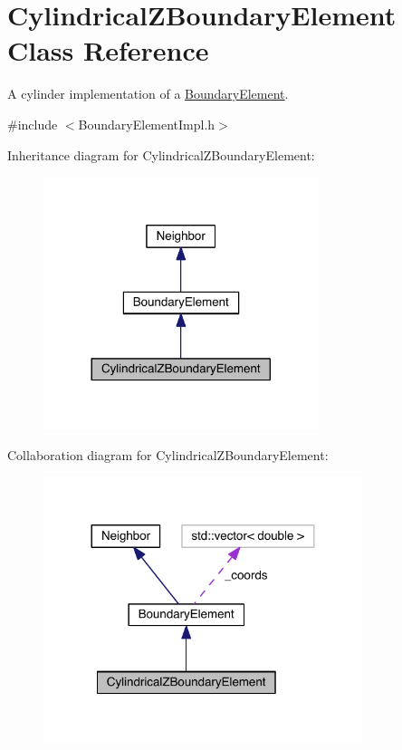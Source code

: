 \hypertarget{classCylindricalZBoundaryElement}{\section{Cylindrical\+Z\+Boundary\+Element Class Reference}
\label{classCylindricalZBoundaryElement}
}


A cylinder implementation of a \hyperlink{classBoundaryElement}{Boundary\+Element}.  




{\ttfamily \#include $<$Boundary\+Element\+Impl.\+h$>$}



Inheritance diagram for Cylindrical\+Z\+Boundary\+Element\+:
\nopagebreak
\begin{figure}[H]
\begin{center}
\leavevmode
\includegraphics[width=228pt]{classCylindricalZBoundaryElement__inherit__graph}
\end{center}
\end{figure}


Collaboration diagram for Cylindrical\+Z\+Boundary\+Element\+:
\nopagebreak
\begin{figure}[H]
\begin{center}
\leavevmode
\includegraphics[width=264pt]{classCylindricalZBoundaryElement__coll__graph}
\end{center}
\end{figure}
